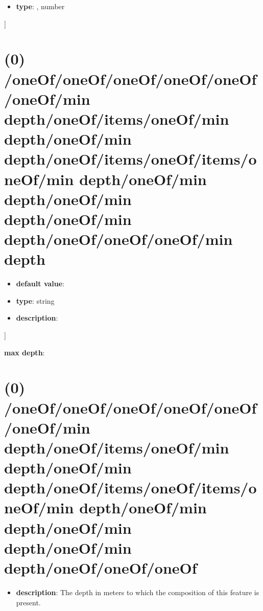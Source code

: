 \begin{itemize}[leftmargin=5em]\item {\bf type}: , number\end{itemize}]\section{(0) /oneOf/oneOf/oneOf/oneOf/oneOf/oneOf/min depth/oneOf/items/oneOf/min depth/oneOf/min depth/oneOf/items/oneOf/items/oneOf/min depth/oneOf/min depth/oneOf/min depth/oneOf/min depth/oneOf/oneOf/oneOf/min depth}
\begin{itemize}[leftmargin=0em]\item {\bf default value}: 
\item {\bf type}: string
\item {\bf description}: 
\end{itemize}]\item {\bf max depth}: \section{(0) /oneOf/oneOf/oneOf/oneOf/oneOf/oneOf/min depth/oneOf/items/oneOf/min depth/oneOf/min depth/oneOf/items/oneOf/items/oneOf/min depth/oneOf/min depth/oneOf/min depth/oneOf/min depth/oneOf/oneOf/oneOf}
\begin{itemize}[leftmargin=0em]\item {\bf description}: The depth in meters to which the composition of this feature is present.
\end{itemize}
